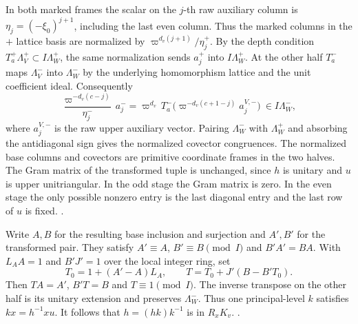 In both marked frames the scalar on the \(j\)-th
raw auxiliary column is
\(\eta_j=(-\xi_0)^{j+1}\), including the last even
column. Thus the marked columns in the \(+\) lattice
basis are normalized by
\(\varpi^{d_v(j+1)}/\eta_j^+\).
By the depth condition \(T_a^+\Lambda_V^+
\subset I\Lambda_W^+\), the same normalization sends
\(a_j^+\) into \(I\Lambda_W^+\).
At the other half \(T_a^-\) maps \(\Lambda_V^-\)
into \(\Lambda_W^-\) by the underlying homomorphism
lattice and the unit coefficient ideal. Consequently
\[
 \frac{\varpi^{-d_v(c-j)}}{\eta_j^-}\,a_j^-
   =\varpi^{d_v}\,
      T_a^-\bigl(\varpi^{-d_v(c+1-j)}a_j^{V,-}\bigr)
   \ \in I\Lambda_W^- ,
\]
where \(a_j^{V,-}\) is the raw upper auxiliary vector.
Pairing \(\Lambda_W^-\) with \(\Lambda_W^+\) and
absorbing the antidiagonal sign gives the normalized
covector congruences. The normalized base columns
and covectors are primitive coordinate frames in the
two halves. The Gram matrix of the transformed tuple
is unchanged, since \(h\) is unitary and \(u\) is
upper unitriangular. In the odd stage the Gram matrix
is zero. In the even stage the only possible nonzero
entry is the last diagonal entry and the last row of
\(u\) is fixed.
.

Write \(A,B\) for the resulting base inclusion and
surjection and \(A',B'\) for the transformed pair.
They satisfy \(A'\equiv A\), \(B'\equiv B\pmod I\)
and \(B'A'=BA\). With \(L_A A=1\) and \(B'J'=1\)
over the local integer ring, set
\[
 T_0=1+(A'-A)L_A,\qquad
 T=T_0+J'(B-B'T_0).
\]
Then \(TA=A'\), \(B'T=B\) and \(T\equiv1\pmod I\).
The inverse transpose on the other half is its unitary
extension and preserves \(\Lambda_W^-\).
Thus one principal-level \(k\) satisfies \(kx=h^{-1}xu\).
It follows that \(h=(h k)k^{-1}\) is in \(R_x K_v\).
.

